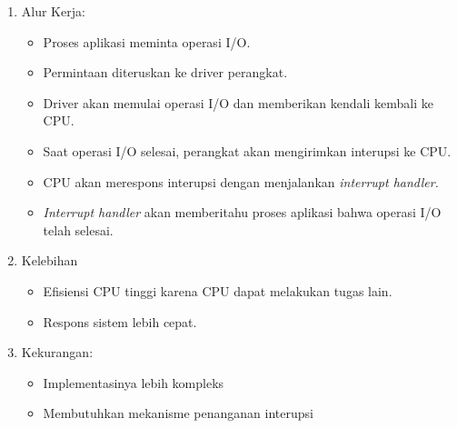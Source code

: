 \documentclass[12pt]{article}
\begin{document}
\begin{enumerate}
\begin{enumerate}
        \item Alur Kerja:
        \begin{itemize}
            \item Proses aplikasi meminta operasi I/O.
            \item Permintaan diteruskan ke driver perangkat.
            \item Driver akan memulai operasi I/O dan memberikan kendali kembali ke CPU.
            \item Saat operasi I/O selesai, perangkat akan mengirimkan interupsi ke CPU.
            \item CPU akan merespons interupsi dengan menjalankan \emph{interrupt handler.}
            \item \emph{Interrupt handler} akan memberitahu proses aplikasi bahwa operasi I/O telah selesai. 
        \end{itemize}
        \item Kelebihan
        \begin{itemize}
            \item Efisiensi CPU tinggi karena CPU dapat melakukan tugas lain.
            \item Respons sistem lebih cepat.
        \end{itemize}
        \item Kekurangan:
        \begin{itemize}
            \item Implementasinya lebih kompleks
            \item Membutuhkan mekanisme penanganan interupsi
        \end{itemize}
    \end{enumerate}
\end{enumerate}
\end{document}
